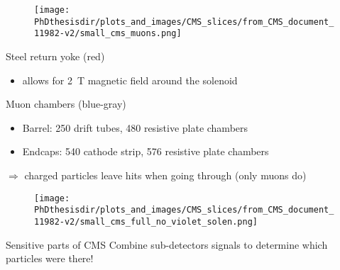 \begin{frame}
\addtocounter{framenumber}{-1}
\begin{minipage}[t]{.6\textwidth}
\begin{figure}
\texttt{[image: \\PhDthesisdir/plots\_and\_images/CMS\_slices/from\_CMS\_document\_11982-v2/small\_cms\_muons.png]}
\end{figure}
\end{minipage}
\hfill\begin{minipage}[t]{.35\textwidth}
\begin{block}{Steel return yoke (red)}
\begin{itemize}
\item allows for \SI{2}{\tesla} magnetic field around the solenoid
\end{itemize}
\end{block}

\begin{block}{Muon chambers (blue-gray)}
\begin{itemize}
\item Barrel: \num{250} drift tubes, \num{480} resistive plate chambers
\item Endcaps: \num{540} cathode strip, \num{576} resistive plate chambers
\end{itemize}
\end{block}

\begin{block}{}
$\Rightarrow$ charged particles leave hits when going through (only muons do)
\end{block}
\vspace{-2\baselineskip}
\end{minipage}
\end{frame}

\begin{frame}
\addtocounter{framenumber}{-1}
\begin{minipage}[t]{.6\textwidth}
\begin{figure}
\texttt{[image: \\PhDthesisdir/plots\_and\_images/CMS\_slices/from\_CMS\_document\_11982-v2/small\_cms\_full\_no\_violet\_solen.png]}
\end{figure}
\end{minipage}
\hfill\begin{minipage}[t]{.35\textwidth}
\begin{block}{Sensitive parts of CMS}
Combine sub-detectors signals to determine which particles were there!
\end{block}
\end{minipage}
\end{frame}